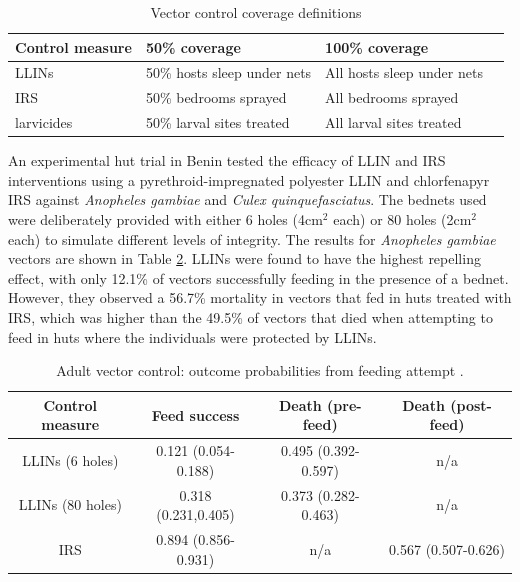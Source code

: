 \begin{table}[t]
\caption{Vector control coverage definitions}%
\vspace{.1cm}
\centering %
\begin{tabular}{|p{15mm}|p{54mm}|p{48mm}|c|}%
\hline                        %
Control measure & 50\% coverage & 100\% coverage \\ [0.5ex]%
\hline                  %
LLINs & 50\% hosts sleep under nets & All hosts sleep under nets \\
IRS & 50\% bedrooms sprayed & All bedrooms sprayed \\
larvicides & 50\% larval sites treated & All larval sites treated \\
[1ex]      %
\hline%
\end{tabular}
\label{table:VecControl}%
\end{table}

An experimental hut trial in Benin tested the efficacy of LLIN and IRS interventions using a pyrethroid-impregnated polyester LLIN and chlorfenapyr IRS \cite{Ngufor2011} against \textit{Anopheles gambiae} and \textit{Culex quinquefasciatus}. The bednets used were deliberately provided with either 6 holes (4cm$^2$ each) or 80 holes (2cm$^2$ each) to simulate different levels of integrity. The results for \textit{Anopheles gambiae} vectors are shown in Table \ref{table:AdultControl}. LLINs were found to have the highest repelling effect, with only 12.1\% of vectors successfully feeding in the presence of a bednet. However, they observed a 56.7\% mortality in vectors that fed in huts treated with IRS, which was higher than the 49.5\% of vectors that died when attempting to feed in huts where the individuals were protected by LLINs.

\begin{table}[t]
\caption{Adult vector control: outcome probabilities from feeding attempt \cite{Ngufor2011}.}%
\vspace{.1cm}
\centering %
\begin{tabular}{|c|c|c|c|}%
\hline                        %
Control measure & Feed success & Death (pre-feed) & Death (post-feed) \\ [0.5ex]%
\hline                  %
LLINs (6 holes) & 0.121 (0.054-0.188) & 0.495 (0.392-0.597) & n/a \\
LLINs (80 holes) & 0.318 (0.231,0.405) & 0.373 (0.282-0.463) & n/a \\
IRS & 0.894 (0.856-0.931) & n/a & 0.567 (0.507-0.626) \\
[1ex]      %
\hline%
\end{tabular}
\label{table:AdultControl}%
\end{table}

